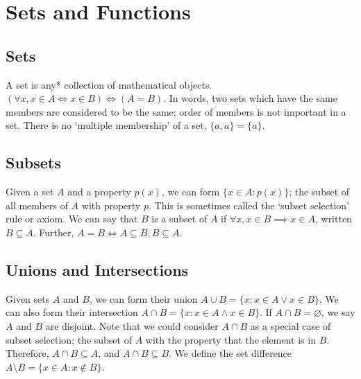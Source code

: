 \documentclass{article}
\begin{document}
\section{Sets and Functions}
\subsection{Sets}
A set is any* collection of mathematical objects. $(\forall x, x \in A \iff x \in B) \iff (A = B)$. In words, two sets which have the same members are considered to be the same; order of members is not important in a set. There is no `multiple membership' of a set, $\{ a, a \} = \{ a \}$.

\subsection{Subsets}
Given a set $A$ and a property $p(x)$, we can form $\{ x \in A: p(x) \}$; the subset of all members of $A$ with property $p$. This is sometimes called the `subset selection' rule or axiom. We can say that $B$ is a subset of $A$ if $\forall x, x \in B \implies x \in A$, written $B \subseteq A$. Further, $A = B \iff A \subseteq B, B \subseteq A$.

\subsection{Unions and Intersections}
Given sets $A$ and $B$, we can form their union $A \cup B = \{ x: x \in A \lor x \in B \}$. We can also form their intersection $A \cap B = \{ x: x \in A \wedge x \in B \}$. If $A \cap B = \varnothing$, we say $A$ and $B$ are disjoint. Note that we could consider $A \cap B$ as a special case of subset selection; the subset of $A$ with the property that the element is in $B$. Therefore, $A \cap B \subseteq A$, and $A \cap B \subseteq B$. We define the set difference $A \setminus B = \{ x \in A: x \notin B \}$.
\end{document}

